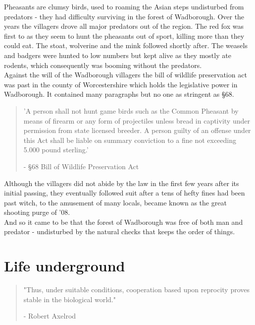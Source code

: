 \documentclass[smalldemyvopaper,11pt,twoside,onecolumn,openright,extrafontsizes]{memoir}
\begin{document}
Pheasants are clumsy birds, used to roaming the Asian steps undisturbed from predators - they had difficulty surviving in the forest of Wadborough. Over the years the villagers drove all major predators out of the region. The red fox was first to as they seem to hunt the pheasants out of sport, killing more than they could eat. The stoat, wolverine and the mink followed shortly after. The weasels and badgers were hunted to low numbers but kept alive as they mostly ate rodents, which consequently was booming without the predators. \\

Against the will of the Wadborough villagers the bill of wildlife preservation act was past in the county of Worcestershire which holds the legislative power in Wadborough. It contained many paragraphs but no one as stringent as §68.

\begin{localsize}{10}
\begin{quote}
'A person shall not hunt game birds such as the Common Pheasant by means of firearm or any form of projectiles unless bread in captivity under permission from state licensed breeder. A person guilty of an offense under this Act shall be liable on summary conviction to a fine not exceeding 5.000 pound sterling.'
\begin{flushright}- §68 Bill of Wildlife Preservation Act\end{flushright}
\end{quote} 
\end{localsize}

Although the villagers did not abide by the law in the first few years after its initial passing, they eventually followed suit after a tens of hefty fines had been past witch, to the amusement of many locals, became known as the great shooting purge of '08.\\

And so it came to be that the forest of Wadborough was free of both man and predator - undisturbed by the natural checks that keeps the order of things.

\chapter{Life underground}

\vspace{-1.3cm}
\begin{localsize}{10}
	\begin{quote}
		"Thus, under suitable conditions, cooperation based upon reprocity proves stable in the biological world."
		\begin{flushright}- Robert Axelrod \end{flushright}
	\end{quote}
\end{localsize}
\vspace{1cm}
\end{document}
